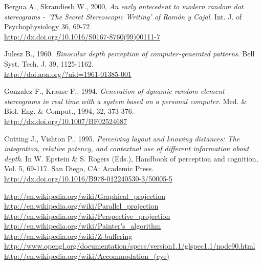 \begin{thebibliography}{12}
Bergua A., Skrandiesb W., 2000, {\it An early antecedent to modern random dot stereograms - 'The Secret Stereoscopic Writing’ of Ram\'on y Cajal}. Int. J. of Psychophysiology 36, 69-72\\
\url{http://dx.doi.org/10.1016/S0167-8760(99)00111-7}

Julesz B., 1960. {\it Binocular depth perception of computer-generated patterns}. Bell Syst. Tech. J. 39, 1125-1162.\\
\url{http://doi.apa.org/?uid=1961-01385-001}

Gonzalez F., Krause F., 1994. {\it Generation of dynamic random-element stereograms in real time with a system based on a personal computer}. Med. \& Biol. Eng. \& Comput., 1994, 32, 373-376.\\
\url{http://dx.doi.org/10.1007/BF02524687}

Cutting J., Vishton P., 1995. {\it Perceiving layout and knowing distances: The integration, relative potency, and contextual use of different information about depth}. In W. Epstein \& S. Rogers (Eds.), Handbook of perception and cognition, Vol. 5, 69-117. San Diego, CA: Academic Press.\\
\url{http://dx.doi.org/10.1016/B978-012240530-3/50005-5}
\end{thebibliography}

\renewcommand*\refname{Links}

\begin{thebibliography}{12}
 \url{http://en.wikipedia.org/wiki/Graphical_projection}
 \url{http://en.wikipedia.org/wiki/Parallel_projection}
 \url{http://en.wikipedia.org/wiki/Perspective_projection}
 \url{http://en.wikipedia.org/wiki/Painter's_algorithm}
 \url{http://en.wikipedia.org/wiki/Z-buffering}
 \url{http://www.opengl.org/documentation/specs/version1.1/glspec1.1/node90.html}
 \url{http://en.wikipedia.org/wiki/Accommodation_(eye)}
\end{thebibliography}
